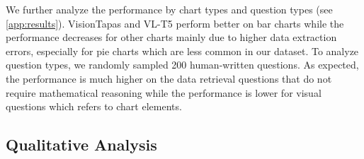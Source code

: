 \begin{table}[h!]
\centering
{}
\caption{
    \small Accuracy of the different models on our benchmark.
    VisionTaPas$\dagger$ does not support difference and ratio operations. 
}
\label{tab:pretrained}
\end{table}

We further analyze 
the performance by
chart types and question types (see \ref{app:results}). %
VisionTapas and VL-T5 perform better on bar charts while the performance decreases for other charts mainly due to higher data extraction errors, especially for pie charts which are less common in our dataset. To analyze question types, we randomly sampled 200 
human-written questions.
 As expected, the performance is much higher on the data retrieval questions that do not require mathematical reasoning  while the performance is lower for visual questions which refers to chart elements.




\subsection{Qualitative Analysis}

